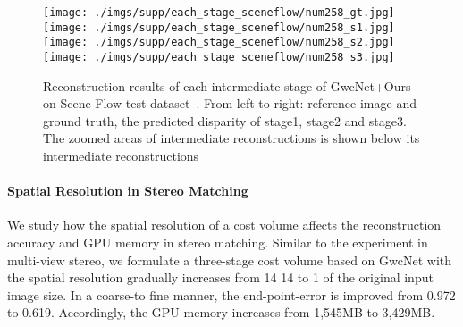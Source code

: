 \documentclass[10pt,twocolumn,letterpaper]{article}
\begin{document}
\begin{figure*}[t!]
\begin{center}
{\texttt{[image: ./imgs/supp/each\_stage\_sceneflow/num258\_gt.jpg]}}
{\texttt{[image: ./imgs/supp/each\_stage\_sceneflow/num258\_s1.jpg]}}
{\texttt{[image: ./imgs/supp/each\_stage\_sceneflow/num258\_s2.jpg]}}
{\texttt{[image: ./imgs/supp/each\_stage\_sceneflow/num258\_s3.jpg]}}


\end{center}
 \caption{Reconstruction results of each intermediate stage of GwcNet+Ours on Scene Flow test dataset~\cite{mayer2016large}. From left to right: reference image and ground truth, the predicted disparity of stage1, stage2 and stage3.
 The zoomed areas of intermediate reconstructions is shown below its intermediate reconstructions}
\label{fig:each_stage_sceneflow}
\end{figure*}

\paragraph{Spatial Resolution in Stereo Matching}

\vspace{-5mm}
We study how the spatial resolution of a cost volume affects the reconstruction accuracy and GPU memory in stereo matching. Similar to the experiment in multi-view stereo, we formulate a three-stage cost volume based on GwcNet with the spatial resolution gradually increases from 14  14 to 1 of the original input image size. In a coarse-to fine manner, the end-point-error is improved from 0.972 to 0.619. Accordingly, the GPU memory increases from 1,545MB to 3,429MB.
\end{document}
